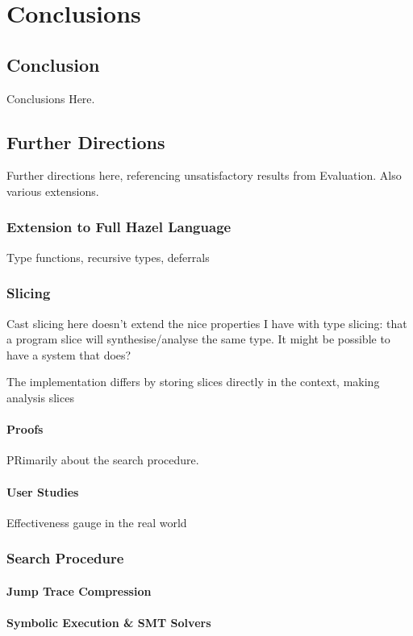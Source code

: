 \chapter{Conclusions}\label{chap:Conclusions}

\section{Conclusion}
Conclusions Here.

\section{Further Directions}
Further directions here, referencing unsatisfactory results from Evaluation. Also various extensions.
\subsection{Extension to Full Hazel Language}
Type functions, recursive types, deferrals

\subsection{Slicing}
Cast slicing here doesn't extend the nice properties I have with type slicing: that a program slice will synthesise/analyse the same type. It might be possible to have a system that does?

The implementation differs by storing slices directly in the context, making analysis slices

\subsubsection{Proofs}
PRimarily about the search procedure.

\subsubsection{User Studies}
Effectiveness gauge in the real world

\subsection{Search Procedure}
\subsubsection{Jump Trace Compression}
\subsubsection{Symbolic Execution \& SMT Solvers}
